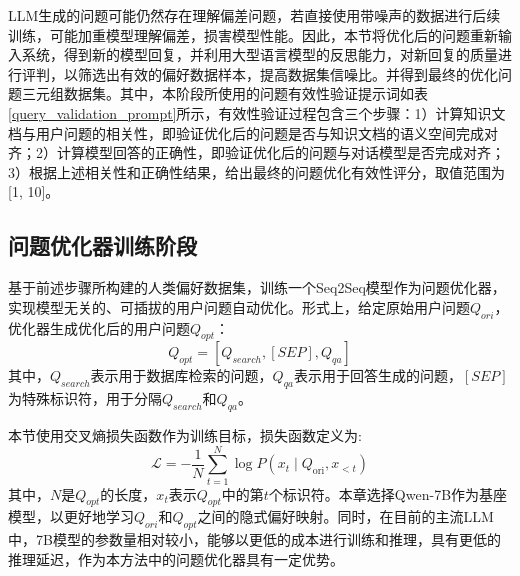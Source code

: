 LLM生成的问题可能仍然存在理解偏差问题，若直接使用带噪声的数据进行后续训练，可能加重模型理解偏差，损害模型性能。因此，本节将优化后的问题重新输入系统，得到新的模型回复，并利用大型语言模型的反思能力，对新回复的质量进行评判，以筛选出有效的偏好数据样本，提高数据集信噪比。并得到最终的优化问题三元组数据集。其中，本阶段所使用的问题有效性验证提示词如表\ref{query_validation_prompt}所示，有效性验证过程包含三个步骤：1）计算知识文档与用户问题的相关性，即验证优化后的问题是否与知识文档的语义空间完成对齐；2）计算模型回答的正确性，即验证优化后的问题与对话模型是否完成对齐；3）根据上述相关性和正确性结果，给出最终的问题优化有效性评分，取值范围为[1, 10]。

\subsection{问题优化器训练阶段}

基于前述步骤所构建的人类偏好数据集，训练一个Seq2Seq\cite{DBLP:journals/corr/abs-2309-16609}模型作为问题优化器，实现模型无关的、可插拔的用户问题自动优化。形式上，给定原始用户问题$Q_{ori}$，优化器生成优化后的用户问题$Q_{opt}$：
\begin{equation}
	Q_{opt} = [Q_{search}, [SEP], Q_{qa}]
\end{equation}
其中，$Q_{search}$表示用于数据库检索的问题，$Q_{qa}$表示用于回答生成的问题，$[SEP]$为特殊标识符，用于分隔$Q_{search}$和$Q_{qa}$。

本节使用交叉熵损失函数作为训练目标，损失函数定义为:
\begin{equation}
	\mathcal{L}=-\frac{1}{N} \sum_{t=1}^N \log P\left(x_t \mid Q_{\text{ori}}, x_{<t}\right)
\end{equation}
其中，$N$是$Q_{opt}$的长度，$x_t$表示$Q_{opt}$中的第$t$个标识符。本章选择Qwen-7B作为基座模型，以更好地学习$Q_{ori}$和$Q_{opt}$之间的隐式偏好映射。同时，在目前的主流LLM中，7B模型的参数量相对较小，能够以更低的成本进行训练和推理，具有更低的推理延迟，作为本方法中的问题优化器具有一定优势。

